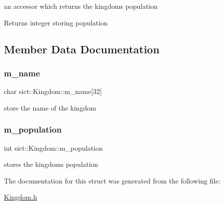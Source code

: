 an accessor which returns the kingdom\textquotesingle{}s population \begin{DoxyReturn}{Returns}
integer storing population 
\end{DoxyReturn}


\subsection{Member Data Documentation}
\mbox{\label{structsict_1_1_kingdom_a1fb836a49142a18ae1dc8b114d7632ef}} 
\subsubsection{\texorpdfstring{m\+\_\+name}{m\_name}}
{\footnotesize\ttfamily char sict\+::\+Kingdom\+::m\+\_\+name\mbox{[}32\mbox{]}}

store the name of the kingdom \mbox{\label{structsict_1_1_kingdom_a78ddd5452f29a4f2df70574dd2d7799c}} 
\subsubsection{\texorpdfstring{m\+\_\+population}{m\_population}}
{\footnotesize\ttfamily int sict\+::\+Kingdom\+::m\+\_\+population}

stores the kingdom\textquotesingle{}s population 

The documentation for this struct was generated from the following file\+:\begin{DoxyCompactItemize}
\item 
\mbox{\hyperlink{_kingdom_8h}{Kingdom.\+h}}\end{DoxyCompactItemize}
